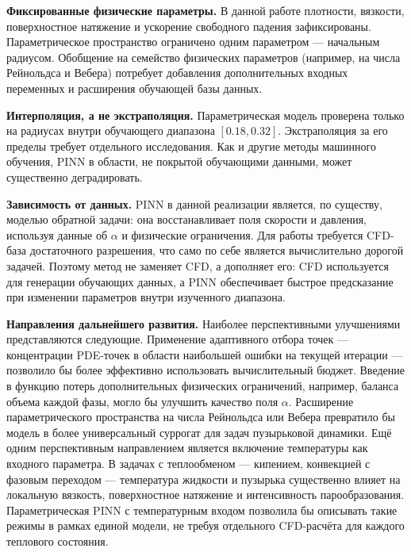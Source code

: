\textbf{Фиксированные физические параметры.} В данной работе плотности,
вязкости, поверхностное натяжение и ускорение свободного падения зафиксированы.
Параметрическое пространство ограничено одним параметром --- начальным радиусом.
Обобщение на семейство физических параметров (например, на числа Рейнольдса и
Вебера) потребует добавления дополнительных входных переменных и расширения
обучающей базы данных.

\textbf{Интерполяция, а не экстраполяция.} Параметрическая модель проверена
только на радиусах внутри обучающего диапазона \([0.18, 0.32]\). Экстраполяция
за его пределы требует отдельного исследования. Как и другие методы машинного
обучения, PINN в области, не покрытой обучающими данными, может существенно
деградировать.

\textbf{Зависимость от данных.} PINN в данной реализации является, по существу,
моделью обратной задачи: она восстанавливает поля скорости и давления, используя
данные об \(\alpha\) и физические ограничения. Для работы требуется CFD-база
достаточного разрешения, что само по себе является вычислительно дорогой задачей.
Поэтому метод не заменяет CFD, а дополняет его: CFD используется для генерации
обучающих данных, а PINN обеспечивает быстрое предсказание при изменении
параметров внутри изученного диапазона.

\textbf{Направления дальнейшего развития.} Наиболее перспективными улучшениями
представляются следующие. Применение адаптивного отбора точек --- концентрации
PDE-точек в области наибольшей ошибки на текущей итерации --- позволило бы
более эффективно использовать вычислительный бюджет. Введение в функцию потерь
дополнительных физических ограничений, например, баланса объема каждой фазы,
могло бы улучшить качество поля \(\alpha\). Расширение параметрического
пространства на числа Рейнольдса или Вебера превратило бы модель в более
универсальный суррогат для задач пузырьковой динамики. Ещё одним перспективным
направлением является включение температуры как входного параметра. В задачах с
теплообменом --- кипением, конвекцией с фазовым переходом --- температура
жидкости и пузырька существенно влияет на локальную вязкость, поверхностное
натяжение и интенсивность парообразования. Параметрическая PINN с температурным
входом позволила бы описывать такие режимы в рамках единой модели, не требуя
отдельного CFD-расчёта для каждого теплового состояния.